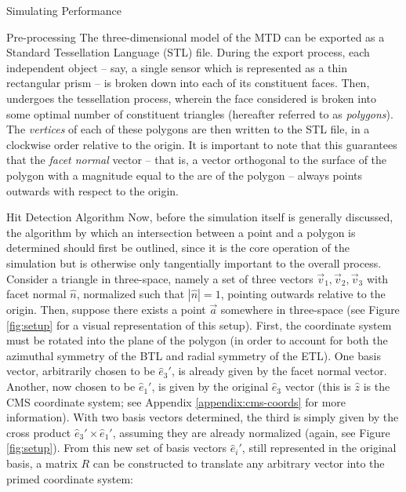 \begin{section}{Simulating Performance}
\begin{subsection}{Pre-processing}
The three-dimensional model of the MTD can be exported as a Standard Tessellation Language (STL) file. During the export process, each independent object -- say, a single sensor which is represented as a thin rectangular prism -- is broken down into each of its constituent faces. Then, undergoes the tessellation process, wherein the face considered is broken into some optimal number of constituent triangles (hereafter referred to as \textit{polygons}). The \textit{vertices} of each of these polygons are then written to the STL file, in a clockwise order relative to the origin. It is important to note that this guarantees that the \textit{facet normal} vector -- that is, a vector orthogonal to the surface of the polygon with a magnitude equal to the are of the polygon -- always points outwards with respect to the origin.
\end{subsection}
\begin{subsection}{Hit Detection Algorithm}
Now, before the simulation itself is generally discussed, the algorithm by which an intersection between a point and a polygon is determined should first be outlined, since it is the core operation of the simulation but is otherwise only tangentially important to the overall process. Consider a triangle in three-space, namely a set of three vectors $\vec{v}_1, \vec{v}_2, \vec{v}_3$ with facet normal $\hat{n}$, normalized such that $|\hat{n}| = 1$, pointing outwards relative to the origin. Then, suppose there exists a point $\vec{a}$ somewhere in three-space (see Figure \ref{fig:setup} for a visual representation of this setup). First, the coordinate system must be rotated into the plane of the polygon (in order to account for both the azimuthal symmetry of the BTL and radial symmetry of the ETL). One basis vector, arbitrarily chosen to be $\hat{e}_3'$, is already given by the facet normal vector. Another, now chosen to be $\hat{e}_{1}'$, is given by the original $\hat{e}_3$ vector (this is $\hat{z}$ is the CMS coordinate system; see Appendix \ref{appendix:cms-coords} for more information). With two basis vectors determined, the third is simply given by the cross product $\hat{e}_3'\times\hat{e}_1'$, assuming they are already normalized (again, see Figure \ref{fig:setup}). From this new set of basis vectors $\hat{e}_i'$, still represented in the original basis, a matrix $R$ can be constructed to translate any arbitrary vector into the primed coordinate system:


\end{subsection}
\end{section}
